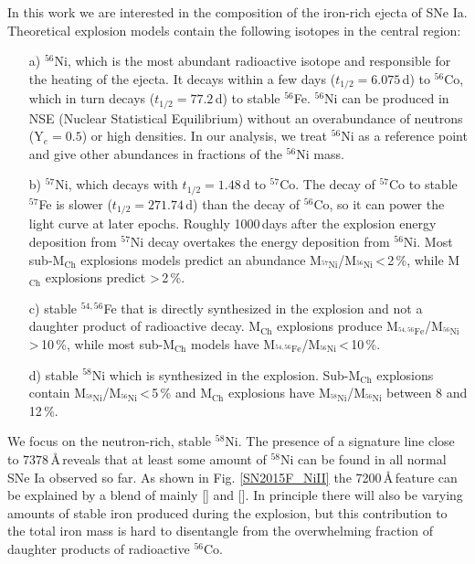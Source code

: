 \documentclass[fleqn,usenatbib]{mnras}
\begin{document}
In this work we are interested in the composition of the iron-rich ejecta of SNe Ia. Theoretical explosion models contain the following isotopes in the central region:
\begin{itemize}
    \item[a)] $^{56}$Ni, which is the most abundant radioactive isotope and responsible for the heating of the ejecta. It decays within a few days ($t_{1/2}=6.075\,$d) to $^{56}$Co, which in turn decays ($t_{1/2}=77.2\,$d) to stable $^{56}$Fe. $^{56}$Ni can be produced in NSE (Nuclear Statistical Equilibrium) without an overabundance of neutrons (Y$_e=0.5$) or high densities. In our analysis, we treat $^{56}$Ni as a reference point and give other abundances in fractions of the $^{56}$Ni mass.   
    \item[b)] $^{57}$Ni, which decays with $t_{1/2}=1.48\,$d to $^{57}$Co. The decay of $^{57}$Co to stable $^{57}$Fe is slower ($t_{1/2}=271.74\,$d) than the decay of $^{56}$Co, so it can power the light curve at later epochs. Roughly 1000\,days after the explosion energy deposition from $^{57}$Ni decay overtakes the energy deposition from $^{56}$Ni. Most sub-M$_{\text{Ch}}$ explosions models predict an abundance M$_{^{57}\text{Ni}}$/M$_{^{56}\text{Ni}}$\,<\,2\,\%, while M$_{\text{Ch}}$ explosions predict >\,2\,\%.
    \item[c)] stable $^{54,56}$Fe that is directly synthesized in the explosion and not a daughter product of radioactive decay. M$_{\text{Ch}}$ explosions produce M$_{^{54,56}\text{Fe}}$/M$_{^{56}\text{Ni}}$\,>\,10\,\%, while most sub-M$_{\text{Ch}}$ models have M$_{^{54,56}\text{Fe}}$/M$_{^{56}\text{Ni}}$\,<\,10\,\%.
    \item[d)] stable $^{58}$Ni which is synthesized in the explosion. Sub-M$_{\text{Ch}}$ explosions contain M$_{^{58}\text{Ni}}$/M$_{^{56}\text{Ni}}$\,<\,5\,\% and M$_{\text{Ch}}$ explosions have M$_{^{58}\text{Ni}}$/M$_{^{56}\text{Ni}}$ between 8 and 12\,\%. 
\end{itemize}
We focus on the neutron-rich, stable $^{58}$Ni. The presence of a signature line close to $7378$\,\AA\,reveals that at least some amount of $^{58}$Ni can be found in all normal SNe Ia observed so far. As shown in Fig. \ref{SN2015F_NiII} the 7200\,\AA\,feature can be explained by a blend of mainly [] and []. In principle there will also be varying amounts of stable iron produced during the explosion, but this contribution to the total iron mass is hard to disentangle from the overwhelming fraction of daughter products of radioactive $^{56}$Co. 
\end{document}
